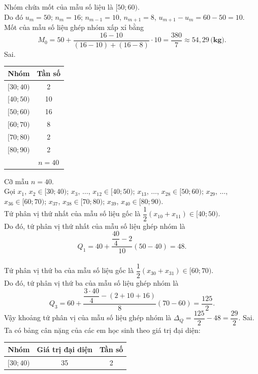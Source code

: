 \begin{ex}
{\begin{itemchoice}
\begin{center}
			\end{center}
			Nhóm chứa mốt của mẫu số liệu là $[50;60)$.\\
			Do đó $u_m=50$; $n_m=16$; $n_{m-1}=10$, $n_{m+1}=8$, $u_{m+1}-u_m=60-50=10$.\\
			Mốt của mẫu số liệu ghép nhóm xấp xỉ bằng
			$$M_0=50+\dfrac{16-10}{(16-10)+(16-8)} \cdot 10=\dfrac{380}{7} \approx 54{,}29\,\textbf{(kg).}$$ 
			\itemch Sai.
			\begin{center}
				\begin{tabular}{|c|c|}
					\hline
					Nhóm & Tần số \\
					\hline
					$[30; 40)$ & 2 \\
					\hline
					$[40; 50)$ & 10 \\
					\hline
					$[50; 60)$ & 16 \\
					\hline
					$[60; 70)$ & 8 \\
					\hline
					$[70; 80)$ & 2 \\
					\hline
					$[80; 90)$ & 2 \\
					\hline
					& $n=40$ \\
					\hline
				\end{tabular}
			\end{center}
			Cỡ mẫu $n=40$.\\
			Gọi
			$x_1$, $x_2\in[30;40)$; $x_3$, $\ldots$, $x_{12}\in[40; 50)$; $x_{13}$, $\ldots$, $x_{28}\in[50;60)$; $x_{29}$, $\ldots$, $x_{36}\in[60;70)$;
			$x_{37}$, $x_{38}\in[70;80)$; $x_{39}$, $x_{40}\in[80; 90)$.\\
			Tứ phân vị thứ nhất của mẫu số liệu gốc là $\dfrac{1}{2}\left(x_{10}+x_{11}\right)\in[40;50)$.\\
			Do đó, tứ phân vị thứ nhất của mẫu số liệu ghép nhóm là
			$$Q_1=40+\dfrac{\dfrac{40}{4}-2}{10}(50-40)=48.$$\\
			Tứ phân vị thứ ba của mẫu số liệu gốc là $\dfrac{1}{2}\left(x_{30}+x_{31}\right)\in[60;70)$.\\
			Do đó, tứ phân vị thứ ba của mẫu số liệu ghép nhóm là
			$$Q_3=60+\dfrac{\dfrac{3\cdot 40}{4}-(2+10+16)}{8}(70-60)=\dfrac{125}{2}.$$
			Vậy khoảng tứ phân vị của mẫu số liệu ghép nhóm là
			$\Delta_Q=\dfrac{125}{2}-48=\dfrac{29}{2}$.
			\itemch Sai. Ta có bảng cân nặng của các em học sinh theo giá trị đại diện:
			\begin{center}
				\begin{tabular}{|c|c|c|}
					\hline
					Nhóm & Giá trị đại diện & Tần số \\
					\hline
					$[30; 40)$ & 35 & 2 \\

\end{tabular}
\end{center}
\end{itemchoice}}
\end{ex}
